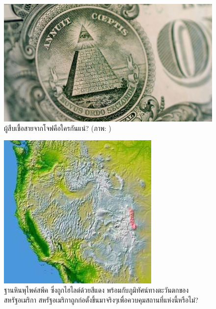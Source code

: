 \documentclass[10pt,twocolumn,letterpaper]{article}
\begin{document}
\begin{figure}[t]
\begin{center}
   \includegraphics[width=1\linewidth]{illuminati.jpg}
\end{center}
   \caption{ผู้สืบเชื้อสายจากโจฟคือใครกันแน่? (ภาพ: \cite{35})}
\label{fig:10}
\label{fig:onecol}
\end{figure}

\begin{figure}[t]
\begin{center}
   \includegraphics[width=1\linewidth]{pike.jpg}
\end{center}
   \caption{ฐานหินพุไพค์สพีค ซึ่งถูกไฮไลต์ด้วยสีแดง พร้อมกับภูมิทัศน์ทางตะวันตกของสหรัฐอเมริกา  \cite{36} สหรัฐอเมริกาถูกก่อตั้งขึ้นมาจริงๆเพื่อควบคุมสถานที่แห่งนี้หรือไม่?}
\label{fig:11}
\label{fig:onecol}
\end{figure}
\end{document}

